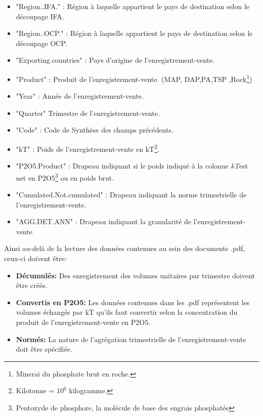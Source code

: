 \begin{enumerate}
\begin{itemize}
	\item "Region..IFA." : Région à laquelle appartient le pays de destination selon le découpage IFA.
	\item "Region..OCP." : Région à laquelle appartient le pays de destination selon le découpage OCP.
	\item "Exporting.countries" : Pays d'origine de l'enregistrement-vente.
	\item "Product" : Produit de l'enregistrement-vente. (MAP, DAP,PA,TSP ,Rock\footnote{Minerai du phosphate brut en roche.})
	\item "Year" : Année de l'enregistrement-vente.
	\item "Quarter" Trimestre de l'enregistrement-vente.
	\item "Code" : Code de Synthèse des champs précédents.
	\item "kT" :  Poids de l'enregistrement-vente en kT\footnote{Kilotonne = $10^6$ kilogramme.}.           
	\item "P2O5.Product" : Drapeau indiquant si le poids indiqué à la colonne \textit{kT}est net en P2O5\footnote{Pentoxyde de phosphore, la molécule de base des engrais phosphatés} ou en poids brut.
	\item "Cumulated.Not.cumulated" : Drapeau indiquant la norme trimestrielle de l'enregistrement-vente.
	\item "AGG.DET.ANN" : Drapeau indiquant la granularité de l'enregistrement-vente
	\end{itemize}
		Ainsi au-delà de la lecture des données contenues au sein des documents .pdf, ceux-ci doivent être:
		\begin{itemize}
		\item \textbf{Décumulés:} Des enregistrement des volumes unitaires par trimestre doivent être créés.
		\item \textbf{Convertis en P2O5:} Les données contenues dans les .pdf représentent les volumes échangés par kT qu'ils faut convertir selon la concentration du produit de l'enregistrement-vente en P2O5.
		\item \textbf{Normés:} La nature de l'agrégation trimestrielle de l'enregistrement-vente doit être spécifiée.
		\end{itemize}
	\end{enumerate}
